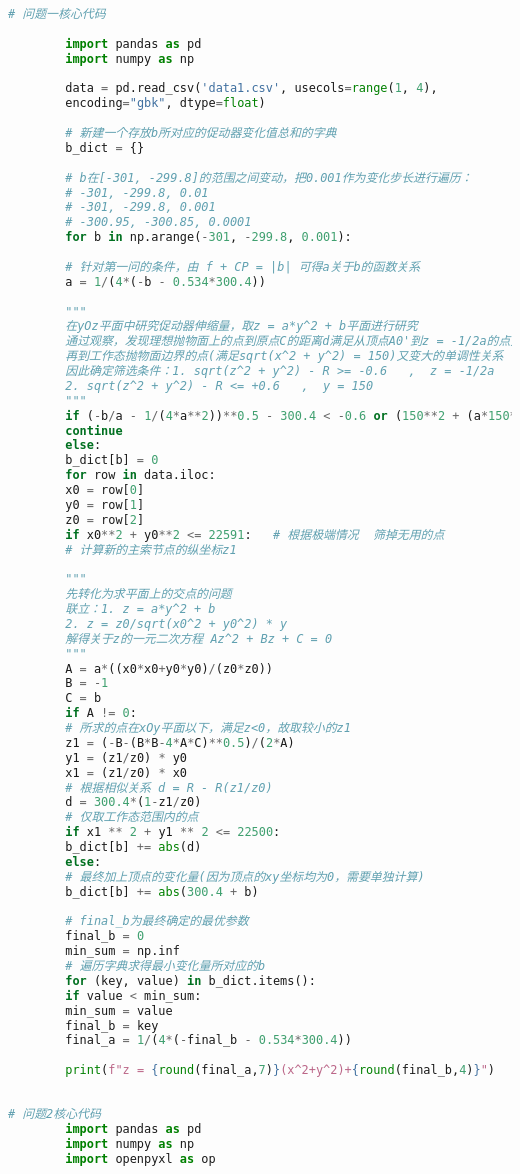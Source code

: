 \documentclass{cumcmthesis}
\begin{document}
\begin{appendices}  
	\begin{lstlisting}[language={python}]  
		# 问题一核心代码
		
		import pandas as pd
		import numpy as np
		
		data = pd.read_csv('data1.csv', usecols=range(1, 4),
		encoding="gbk", dtype=float)
		
		# 新建一个存放b所对应的促动器变化值总和的字典
		b_dict = {}
		
		# b在[-301, -299.8]的范围之间变动，把0.001作为变化步长进行遍历：
		# -301, -299.8, 0.01
		# -301, -299.8, 0.001
		# -300.95, -300.85, 0.0001
		for b in np.arange(-301, -299.8, 0.001):
		
		# 针对第一问的条件，由 f + CP = |b| 可得a关于b的函数关系
		a = 1/(4*(-b - 0.534*300.4))
		
		"""
		在yOz平面中研究促动器伸缩量，取z = a*y^2 + b平面进行研究
		通过观察，发现理想抛物面上的点到原点C的距离d满足从顶点A0'到z = -1/2a的点先变小，
		再到工作态抛物面边界的点(满足sqrt(x^2 + y^2) = 150)又变大的单调性关系
		因此确定筛选条件：1. sqrt(z^2 + y^2) - R >= -0.6   ,  z = -1/2a
		2. sqrt(z^2 + y^2) - R <= +0.6   ,  y = 150
		"""
		if (-b/a - 1/(4*a**2))**0.5 - 300.4 < -0.6 or (150**2 + (a*150**2+b)**2)**0.5 - 300.4 > 0.6:
		continue
		else:
		b_dict[b] = 0
		for row in data.iloc:
		x0 = row[0]
		y0 = row[1]
		z0 = row[2]
		if x0**2 + y0**2 <= 22591:   # 根据极端情况  筛掉无用的点
		# 计算新的主索节点的纵坐标z1
		
		"""
		先转化为求平面上的交点的问题
		联立：1. z = a*y^2 + b
		2. z = z0/sqrt(x0^2 + y0^2) * y
		解得关于z的一元二次方程 Az^2 + Bz + C = 0
		"""
		A = a*((x0*x0+y0*y0)/(z0*z0))
		B = -1
		C = b
		if A != 0:
		# 所求的点在xOy平面以下，满足z<0，故取较小的z1
		z1 = (-B-(B*B-4*A*C)**0.5)/(2*A)
		y1 = (z1/z0) * y0
		x1 = (z1/z0) * x0
		# 根据相似关系 d = R - R(z1/z0)
		d = 300.4*(1-z1/z0)
		# 仅取工作态范围内的点
		if x1 ** 2 + y1 ** 2 <= 22500:
		b_dict[b] += abs(d)
		else:
		# 最终加上顶点的变化量(因为顶点的xy坐标均为0，需要单独计算)
		b_dict[b] += abs(300.4 + b)
		
		# final_b为最终确定的最优参数
		final_b = 0
		min_sum = np.inf
		# 遍历字典求得最小变化量所对应的b
		for (key, value) in b_dict.items():
		if value < min_sum:
		min_sum = value
		final_b = key
		final_a = 1/(4*(-final_b - 0.534*300.4))
		
		print(f"z = {round(final_a,7)}(x^2+y^2)+{round(final_b,4)}")
		
	\end{lstlisting}  %
	\begin{lstlisting}[language={python}]  
		# 问题2核心代码
		import pandas as pd
		import numpy as np
		import openpyxl as op
		

\end{lstlisting}
\end{appendices}
\end{document}
